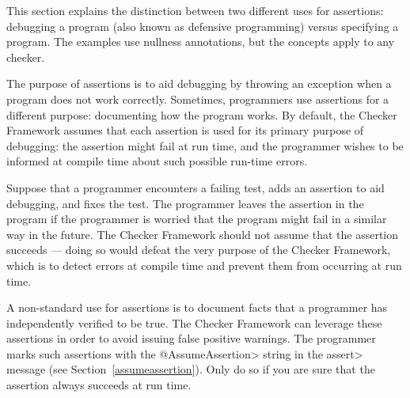 



This section explains the distinction between two different uses for
assertions:  debugging a program (also known as defensive programming)
versus specifying a program.  The examples use nullness annotations, but
the concepts apply to any checker.

The purpose of assertions is to aid debugging by throwing an exception
when a program does not work correctly.  Sometimes, programmers use assertions for a
different purpose:  documenting how
the program works.  By default, the Checker Framework assumes that each assertion
is used for its primary purpose of debugging:  the assertion might fail at run time, and the programmer
wishes to be informed at compile time about such possible run-time errors.

Suppose that a
programmer encounters a failing test, adds an assertion to aid debugging, and fixes the
test.  The programmer leaves the assertion in the program if the programmer
is worried that the program might fail in a similar way in the future.
The Checker Framework should not assume that the assertion succeeds ---
doing so would defeat the very purpose of the Checker Framework, which is
to detect errors at compile time and prevent them from occurring at run
time.

A non-standard use for assertions is to document facts that a programmer
has independently verified to be true.  The Checker Framework can
leverage these assertions in order to avoid issuing false positive
warnings.  The programmer marks such assertions with the \<@AssumeAssertion>
string in the \<assert> message (see Section~\ref{assumeassertion}).  Only
do so if you are sure that the assertion always succeeds at run time.

